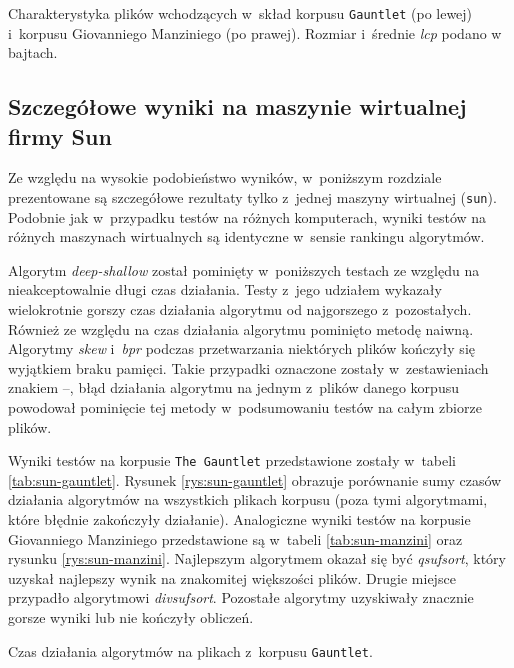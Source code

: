 \begin{table}[ht]
\begin{center}
    \end{center}                         
    \caption{Charakterystyka plików wchodzących w~skład korpusu \texttt{Gauntlet}
    (po lewej) i~korpusu Giovanniego Manziniego (po prawej). Rozmiar i~średnie \emph{lcp} podano w bajtach.}%
    \label{tab:gauntlet-files}\label{tab:manzini-files}
\end{table}


\subsection{Szczegółowe wyniki na maszynie wirtualnej firmy Sun}
    
Ze względu na wysokie podobieństwo wyników, w~poniższym rozdziale prezentowane są szczegółowe
rezultaty tylko z~jednej maszyny wirtualnej (\texttt{sun}). Podobnie jak w~przypadku testów na
różnych komputerach, wyniki testów na różnych maszynach wirtualnych są identyczne w~sensie rankingu
algorytmów.
	
Algorytm \emph{deep-shallow} został pominięty w~poniższych testach ze względu na nieakceptowalnie długi
czas działania. Testy z~jego udziałem wykazały wielokrotnie gorszy czas działania algorytmu od
najgorszego z~pozostałych. Również ze względu na czas działania algorytmu pominięto metodę naiwną.
Algorytmy \emph{skew} i~\emph{bpr} podczas przetwarzania niektórych plików kończyły się wyjątkiem
braku pamięci. Takie przypadki oznaczone zostały w~zestawieniach znakiem --, błąd
działania algorytmu na jednym z~plików danego korpusu powodował pominięcie tej metody w~podsumowaniu
testów na całym zbiorze plików.
	
Wyniki testów na korpusie \texttt{The Gauntlet} przedstawione zostały w~tabeli
\ref{tab:sun-gauntlet}. Rysunek \ref{rys:sun-gauntlet} obrazuje porównanie sumy czasów działania
algorytmów na wszystkich plikach korpusu (poza tymi algorytmami, które błędnie zakończyły
działanie). Analogiczne wyniki testów na korpusie Giovanniego Manziniego przedstawione są w~tabeli
\ref{tab:sun-manzini} oraz rysunku \ref{rys:sun-manzini}. Najlepszym algorytmem okazał się być
\emph{qsufsort}, który uzyskał najlepszy wynik na znakomitej większości plików. Drugie miejsce
przypadło algorytmowi \emph{divsufsort}. Pozostałe algorytmy uzyskiwały znacznie gorsze wyniki lub
nie kończyły obliczeń.


\begin{table}[ht]
    \begin{center}        
        
    \end{center}                         
    \caption{Czas działania algorytmów na plikach z~korpusu \texttt{Gauntlet}.}%
    \label{tab:sun-gauntlet}
\end{table}

